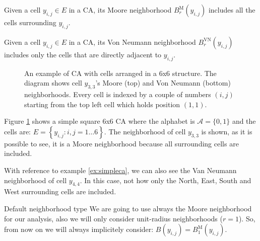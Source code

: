 \begin{definition}
\label{def:neighmoore}
Given a cell $y_{i,j} \in E$ in a CA, its Moore neighborhood $B^\text{M}_r\left( y_{i,j} \right)$
includes all the cells surrounding
$y_{i,j}$.
\end{definition}

\begin{definition}
\label{def:neighmoore}
Given a cell $y_{i,j} \in E$ in a CA, its Von Neumann neighborhood $B^\text{VN}_r\left( y_{i,j} \right)$
includes only the cells that are
directly adjacent to $y_{i,j}$.
\end{definition}

%
\begin{figure}[b]
\sidecaption

%
%
\caption{An example of CA with cells arranged in a 6x6 structure. The diagram shows cell $y_{3,3}$'s
Moore (top) and Von Neumann (bottom) neighborhoods.
Every cell is indexed by a couple of numbers $(i,j)$ starting
from the top left cell which holds position $(1,1)$.}
\label{fig:exampleca}
\end{figure}
%

\begin{example}
\label{ex:simpleca}
Figure \ref{fig:exampleca} shows a simple square 6x6 CA
where the alphabet is $\mathcal{A}=\{ 0, 1 \}$ and the
cells are: $E = \left\{ y_{i,j} : i,j = 1 \dots 6 \right\}$. The neighborhood of cell $y_{3,3}$
is shown, as it is possible to see, it is a Moore neighborhood because all surrounding cells are
included.
\end{example}

\begin{example}
\label{ex:vnneigh}
With reference to example \ref{ex:simpleca}, we can also see the Van Neumann neighborhood of
cell $y_{4,4}$. In this case, not how only the North, East, South and West surrounding cells
are included.
\end{example}

\begin{important}{Default neighborhood type}
We are going to use always the Moore neighborhood for our analysis, also we will only consider
unit-radius neighborhoods ($r=1$). So, from now on we will always implicitely consider:
$B\left( y_{i,j} \right) = B^\text{M}_1\left( y_{i,j} \right)$.
\end{important}

